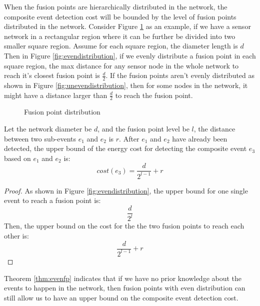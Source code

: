 When the fusion points are hierarchically distributed in the network, the composite event detection cost will be bounded by the level of fusion points distributed in the network. Consider Figure \ref{fig:fpdistribution} as an example, if we have a sensor network in a rectangular region where it can be further be divided into two smaller square region. Assume for each square region, the diameter length is \(d\) Then in Figure \ref{fig:evendistribution}, if we evenly distribute a fusion point in each square region, the max distance for any sensor node in the whole network to reach it's closest fusion point is \(\frac{d}{2}\). If the fusion points aren't evenly distributed as shown in Figure \ref{fig:unevendistribution}, then for some nodes in the network, it might have a distance larger than \(\frac{d}{2}\) to reach the fusion point.

\begin{figure}
\centering
{}
\caption{Fusion point distribution}
\label{fig:fpdistribution}
\end{figure}

\begin{theorem}
\label{thm:evenfp}
Let the network diameter be \(d\), and the fusion point level be \(l\), the distance between two sub-events \(e_1\) and \(e_2\) is \(r\). After \(e_1\) and \(e_2\) have already been detected, the upper bound of the energy cost for detecting the composite event \(e_3\) based on \(e_1\) and \(e_2\) is:
\[
cost(e_3)=\frac{d}{2^{l-1}}+r
\]
\end{theorem}

\begin{proof}
As shown in Figure \ref{fig:evendistribution}, the upper bound for one single event to reach a fusion point is:
\begin{displaymath}
\frac{d}{2^{l}}
\end{displaymath}
Then, the upper bound on the cost for the the two fusion points to reach each other is:
\begin{displaymath}
\frac{d}{2^{l-1}}+r
\end{displaymath}
\end{proof}

Theorem \ref{thm:evenfp} indicates that if we have no prior knowledge about the events to happen in the network, then fusion points with even distribution can still allow us to have an upper bound on the composite event detection cost.

